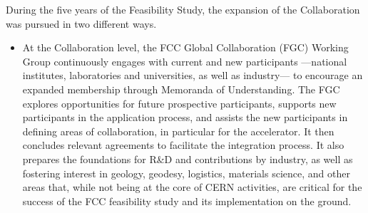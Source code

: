 During the five years of the Feasibility Study, the expansion of the Collaboration was pursued in two different ways.

\begin{itemize}

\item[A.] At the Collaboration level, the FCC Global Collaboration (FGC) Working Group continuously engages with current and new participants ---national institutes, laboratories and universities, as well as industry--- to encourage an expanded membership through Memoranda of Understanding. 
The FGC explores opportunities for future prospective participants, supports new participants in the application process, and assists the new participants in defining areas of collaboration, in particular for the accelerator. 
It then concludes relevant agreements to facilitate the integration process. 
It also prepares the foundations for R\&D and contributions by industry, 
as well as fostering interest in geology, geodesy, logistics, materials science, and other areas that, 
while not being at the core of CERN activities, 
are critical for the success of the FCC feasibility study and its implementation on the ground.


\end{itemize}

